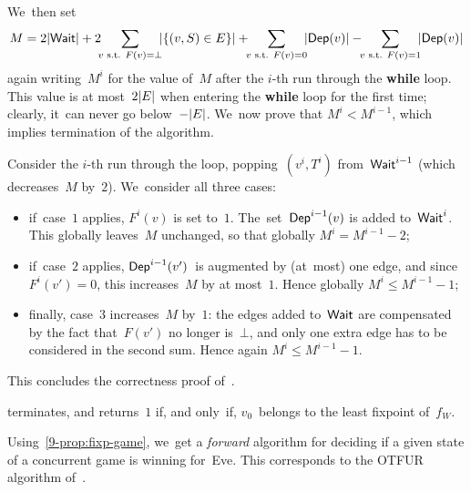 We~then set
\[
M= 
2\size{\Wait} + 
2\hskip-4pt\sum_{v\text{ s.t. }F(v)=\bot}\hskip-4pt \size{\{(v,S)\in E\}} 
+ \hskip-4pt\sum_{v\text{ s.t. }F(v)=0}\hskip-4pt \size{\Dep(v)}
- \hskip-4pt\sum_{v\text{ s.t. }F(v)=1}\hskip-4pt \size{\Dep(v)}
\]
again writing~$M^i$ for the value of~$M$ after the $i$-th run through
the \textbf{while} loop.  This value is at most~$2|E|$ when
entering the \textbf{while} loop for the first time; clearly, it~can
never go below~$-|E|$. We~now prove that $M^{i}<M^{i-1}$,
which implies termination of the algorithm.

Consider the $i$-th run through the loop, popping~$(v^i,T^i)$
from~$\textsf{Wait}^{i-1}$ (which decreases~$M$ by~$2$). We~consider all three cases:
\begin{itemize}
\item if~case~$1$ applies, $F^i(v)$ is set to~$1$.
  The~set~$\textsf{Dep}^{i-1}(v)$ is added to~$\textsf{Wait}^i$. This globally
  leaves~$M$ unchanged, so that globally $M^i=M^{i-1}-2$;
\item if~case~$2$ applies, $\textsf{Dep}^{i-1}(v')$~is augmented by (at~most) one edge,
  and since $F^i(v')=0$, this increases~$M$ by at most~$1$. Hence globally
  $M^i\leq M^{i-1}-1$;
\item finally, case~$3$ increases~$M$ by~$1$: the edges added
  to~$\textsf{Wait}$ are compensated by the fact that~$F(v')$ no longer
  is~$\bot$, and only one extra edge has to be considered in the
  second sum. Hence again $M^i\leq M^{i-1}-1$.
\end{itemize}
This concludes the correctness proof of~.

\begin{theorem}
 terminates, and returns~$1$ if, and only~if,
$v_0$~belongs to the least fixpoint of~$f_W$.
\end{theorem}

Using~\cref{9-prop:fixp-game}, we~get a \emph{forward} algorithm for
deciding if a given state of a concurrent game is winning
for~Eve. This corresponds to the OTFUR algorithm
of~\cite{CDFLL05}.



